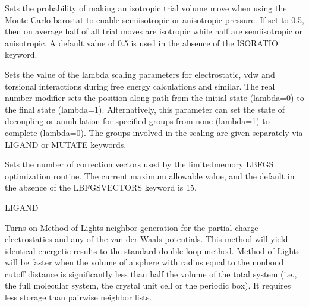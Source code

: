 \documentclass[letterpaper,11pt,english]{sphinxmanual}
\begin{document}
\ignorespaces {}\label{\detokenize{text/keywords:key-isoratio}}\begin{description}
\sphinxAtStartPar
Sets the probability of making an isotropic trial volume move when using the Monte Carlo barostat to enable semi\sphinxhyphen{}isotropic or anisotropic pressure. If set to 0.5, then on average half of all trial moves are isotropic while half are semi\sphinxhyphen{}isotropic or anisotropic. A default value of 0.5 is used in the absence of the ISORATIO keyword.

\end{description}

\ignorespaces {}\label{\detokenize{text/keywords:key-lambda}}\begin{description}
\sphinxAtStartPar
Sets the value of the lambda scaling parameters for electrostatic, vdw and torsional interactions during free energy calculations and similar. The real number modifier sets the position along path from the initial state (lambda=0) to the final state (lambda=1). Alternatively, this parameter can set the state of decoupling or annihilation for specified groups from none (lambda=1) to complete (lambda=0). The groups involved in the scaling are given separately via LIGAND or MUTATE keywords.

\end{description}

\ignorespaces {}\label{\detokenize{text/keywords:key-lbfgs-vectors}}\begin{description}
\sphinxAtStartPar
Sets the number of correction vectors used by the limited\sphinxhyphen{}memory L\sphinxhyphen{}BFGS optimization routine. The current maximum allowable value, and the default in the absence of the LBFGS\sphinxhyphen{}VECTORS keyword is 15.

\end{description}

\ignorespaces {}\label{\detokenize{text/keywords:key-ligand}}
\sphinxAtStartPar
LIGAND

\ignorespaces {}\label{\detokenize{text/keywords:key-lights}}\begin{description}
\sphinxAtStartPar
Turns on Method of Lights neighbor generation for the partial charge electrostatics and any of the van der Waals potentials. This method will yield identical energetic results to the standard double loop method. Method of Lights will be faster when the volume of a sphere with radius equal to the nonbond cutoff distance is significantly less than half the volume of the total system (i.e., the full molecular system, the crystal unit cell or the periodic box). It requires less storage than pairwise neighbor lists.

\end{description}
\end{document}
